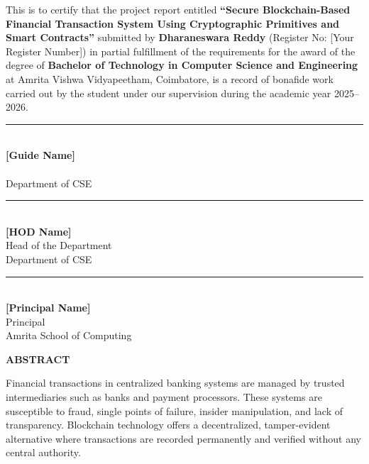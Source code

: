 \documentclass[12pt,a4paper]{report}
\begin{document}
\noindent This is to certify that the project report entitled
\textbf{``Secure Blockchain-Based Financial Transaction System Using Cryptographic Primitives and Smart Contracts''}
submitted by \textbf{Dharaneswara Reddy} (Register No: [Your Register Number])
in partial fulfillment of the requirements for the award of the degree of
\textbf{Bachelor of Technology in Computer Science and Engineering}
at Amrita Vishwa Vidyapeetham, Coimbatore, is a record of bonafide work
carried out by the student under our supervision during the academic year
2025--2026.

\vspace{2cm}

\noindent
\begin{minipage}{0.45\textwidth}
  \centering
  \rule{6cm}{0.4pt}\\
  \textbf{[Guide Name]}\\
  [Designation]\\
  Department of CSE
\end{minipage}
\hfill
\begin{minipage}{0.45\textwidth}
  \centering
  \rule{6cm}{0.4pt}\\
  \textbf{[HOD Name]}\\
  Head of the Department\\
  Department of CSE
\end{minipage}

\vspace{2cm}
\noindent
\begin{center}
  \rule{6cm}{0.4pt}\\
  \textbf{[Principal Name]}\\
  Principal\\
  Amrita School of Computing
\end{center}

\newpage

\thispagestyle{plain}
\begin{center}
  {\fontsize{16}{22}\bfseries ABSTRACT}
\end{center}
\vspace{0.5cm}

\noindent
Financial transactions in centralized banking systems are managed by trusted intermediaries
such as banks and payment processors. These systems are susceptible to fraud, single points
of failure, insider manipulation, and lack of transparency. Blockchain technology offers a
decentralized, tamper-evident alternative where transactions are recorded permanently and
verified without any central authority.
\end{document}
